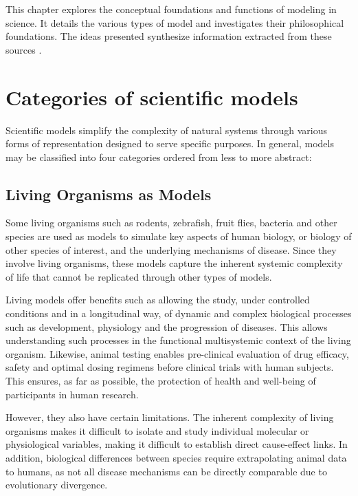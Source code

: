 This chapter explores the conceptual foundations and functions of modeling in science. It details the various types of model and investigates their philosophical foundations. The ideas presented synthesize information extracted from these sources \citep{Rosenblueth1945,Borges1982,Box1976}.

\section{Categories of scientific models}

Scientific models simplify the complexity of natural systems through various forms of representation designed to serve specific purposes. In general, models may be classified into four categories ordered from less to more abstract:

\subsection{Living Organisms as Models}

Some living organisms such as rodents, zebrafish, fruit flies, bacteria and other species are used as models to simulate key aspects of human biology, or biology of other species of interest, and the underlying mechanisms of disease. Since they involve living organisms, these models capture the inherent systemic complexity of life that cannot be replicated through other types of models.

Living models offer benefits such as allowing the study, under controlled conditions and in a longitudinal way, of dynamic and complex biological processes such as development, physiology and the progression of diseases. This allows understanding such processes in the functional multisystemic context of the living organism. Likewise, animal testing enables pre-clinical evaluation of drug efficacy, safety and optimal dosing regimens before clinical trials with human subjects. This ensures, as far as possible, the protection of health and well-being of participants in human research.

However, they also have certain limitations. The inherent complexity of living organisms makes it difficult to isolate and study individual molecular or physiological variables, making it difficult to establish direct cause-effect links. In addition, biological differences between species require extrapolating animal data to humans, as not all disease mechanisms can be directly comparable due to evolutionary divergence.

